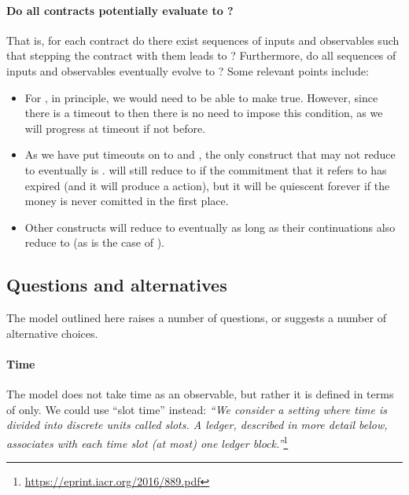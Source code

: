 \documentclass[runningheads]{llncs}
\begin{document}
\paragraph{Do all contracts potentially evaluate to ?}

That is, for each contract do there exist sequences of inputs and observables such that stepping the contract with them 
leads to ? Furthermore, do all sequences of inputs and observables eventually evolve to 
? Some relevant points include:
\begin{itemize}
\item For , in principle, we would need to be able to make  
true. However, since there is  a timeout to  then there is no need to impose this condition, as we 
will progress at timeout if not before.
\item As we have put timeouts on to  and , the only construct that may not 
reduce to  eventually is .  will still reduce to 
 if the commitment that it refers to has expired (and it will produce a 
 action), but it will be quiescent forever if the money is never comitted in the first 
place.
\item Other constructs will reduce to  eventually as long as their continuations also reduce to 
 (as is the case of ).
\end{itemize}

\subsection{Questions and alternatives}

The model outlined here raises a number of questions, or suggests a number of alternative choices.

\paragraph{Time}

The model does not take time as an observable, but rather it is defined in terms of  only. 
We could  use ``slot time'' instead: \emph{``We consider a setting where time is divided into discrete units called 
slots. A ledger, described in more detail below, associates with each time slot (at most) one ledger 
block.''}\footnote{\url{https://eprint.iacr.org/2016/889.pdf}}
\end{document}
